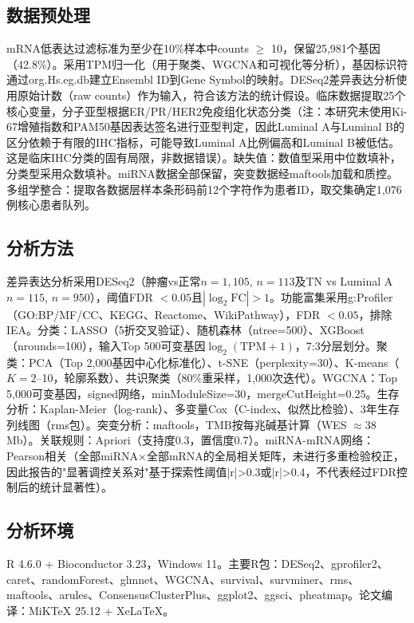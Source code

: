 \documentclass[12pt,a4paper]{ctexart}
\begin{document}
\subsection{数据预处理}
mRNA低表达过滤标准为至少在10\%样本中counts $\geq$ 10，保留25,981个基因（42.8\%）。采用TPM归一化（用于聚类、WGCNA和可视化等分析），基因标识符通过org.Hs.eg.db建立Ensembl ID到Gene Symbol的映射。DESeq2差异表达分析使用原始计数（raw counts）作为输入，符合该方法的统计假设。临床数据提取25个核心变量，分子亚型根据ER/PR/HER2免疫组化状态分类（注：本研究未使用Ki-67增殖指数和PAM50基因表达签名进行亚型判定，因此Luminal A与Luminal B的区分依赖于有限的IHC指标，可能导致Luminal A比例偏高和Luminal B被低估。这是临床IHC分类的固有局限，非数据错误）。缺失值：数值型采用中位数填补，分类型采用众数填补。miRNA数据全部保留，突变数据经maftools\cite{mayakonda2018maftools}加载和质控。多组学整合：提取各数据层样本条形码前12个字符作为患者ID，取交集确定1,076例核心患者队列。

\subsection{分析方法}
差异表达分析采用DESeq2\cite{love2014moderated}（肿瘤vs正常$n=1,105$, $n=113$及TN vs Luminal A $n=115$, $n=950$），阈值FDR $<0.05$且$|\log_2\text{FC}|>1$。功能富集采用g:Profiler\cite{kolberg2023gprofiler}（GO:BP/MF/CC、KEGG、Reactome、WikiPathway），FDR $<0.05$，排除IEA。分类：LASSO（5折交叉验证）、随机森林（ntree=500）、XGBoost（nrounds=100），输入Top 500可变基因$\log_2(\text{TPM}+1)$，7:3分层划分。聚类：PCA（Top 2,000基因中心化标准化）、t-SNE（perplexity=30）、K-means（$K=2$--10，轮廓系数）、共识聚类\cite{wilkerson2010consensus}（80\%重采样，1,000次迭代）。WGCNA\cite{langfelder2008wgcna}：Top 5,000可变基因，signed网络，minModuleSize=30，mergeCutHeight=0.25。生存分析：Kaplan-Meier（log-rank）、多变量Cox（C-index、似然比检验）、3年生存列线图（rms包）。突变分析：maftools\cite{mayakonda2018maftools}，TMB按每兆碱基计算（WES $\approx$38 Mb）。关联规则：Apriori（支持度0.3，置信度0.7）。miRNA-mRNA网络：Pearson相关（全部miRNA×全部mRNA的全局相关矩阵，未进行多重检验校正，因此报告的"显著调控关系对"基于探索性阈值|r|>0.3或|r|>0.4，不代表经过FDR控制后的统计显著性）。

\subsection{分析环境}
R 4.6.0 + Bioconductor 3.23，Windows 11。主要R包：DESeq2、gprofiler2、caret、randomForest、glmnet、WGCNA、survival、survminer、rms、maftools、arules、ConsensusClusterPlus、ggplot2、ggsci、pheatmap。论文编译：MiKTeX 25.12 + XeLaTeX。
\end{document}
